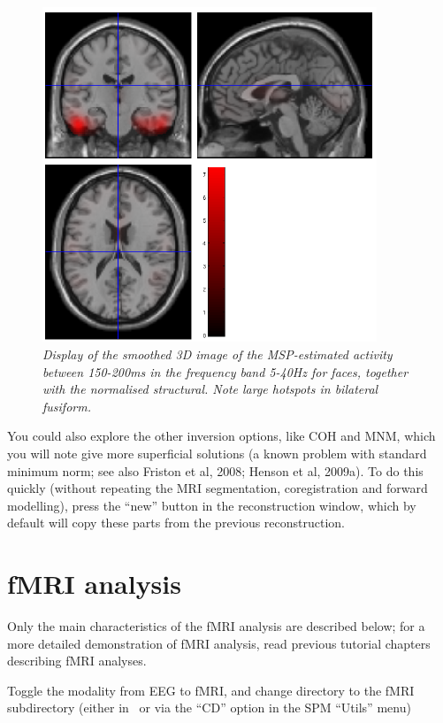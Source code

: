 \begin{figure}
\begin{center}
\includegraphics[width=100mm]{multimodal/figures/meg_msp_image}
\caption{\em  Display of the smoothed 3D image of the MSP-estimated activity between 150-200ms in the frequency band 5-40Hz for faces, together with the normalised structural. Note large hotspots in bilateral fusiform.\label{multimodal:fig:19}}
\end{center}
\end{figure}

You could also explore the other inversion options, like COH and MNM, which you will note give more superficial solutions (a known problem with standard minimum norm; see also Friston et al, 2008; Henson et al, 2009a). To do this quickly (without repeating the MRI segmentation, coregistration and forward modelling), press the ``new'' button in the reconstruction window, which by default will copy these parts from the previous reconstruction.

\section{fMRI analysis \label{multimodal:data:fMRI}}

Only the main characteristics of the fMRI analysis are described below; for a more detailed demonstration of fMRI analysis, read previous tutorial chapters describing fMRI analyses.

Toggle the modality from EEG to fMRI, and change directory to the fMRI subdirectory (either in \matlab\, or via the ``CD'' option in the SPM ``Utils'' menu)

